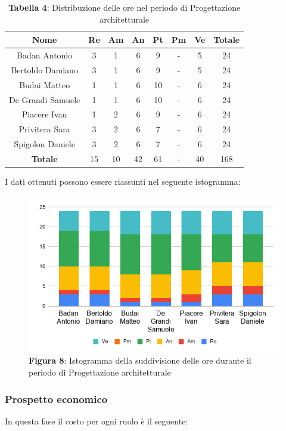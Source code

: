 \begin{table}[H]
	\centering
	\renewcommand{\arraystretch}{1.5}
	\begin{tabular}{|c|c|c|c|c|c|c|c|}
		\hline
		\rowcolor{lighter-grayer}
Nome & Re & Am & An & Pt & Pm & Ve & Totale \\ \hline
Badan Antonio & 3 & 1 & 6 & 9 & - & 5 & 24 \\ \hline
Bertoldo Damiano & 3 & 1 & 6 & 9 & - & 5 & 24 \\ \hline
Budai Matteo & 1 & 1 & 6 & 10 & - & 6 & 24 \\ \hline
De Grandi Samuele & 1 & 1 & 6 & 10 & - & 6 & 24 \\ \hline
Piacere Ivan & 1 & 2 & 6 & 9 & - & 6 & 24 \\ \hline
Privitera Sara & 3 & 2 & 6 & 7 & - & 6 & 24 \\ \hline
Spigolon Daniele & 3 & 2 & 6 & 7 & - & 6 & 24 \\ \hline
\textbf{Totale} & 15 & 10 & 42 & 61 & - & 40 & 168 \\ \hline
	\end{tabular}
	\caption*{\textbf{Tabella 4}: Distribuzione delle ore nel periodo di Progettazione architetturale\\}
\end{table}	
I dati ottenuti possono essere riassunti nel seguente istogramma:

\begin{figure}[H]
	\centering
	\includegraphics[width=0.7\linewidth]{res/images/IstogrammaFase2.png}
	\caption*{\textbf{Figura 8}: Istogramma della suddivisione delle ore durante il periodo di Progettazione architetturale}
	\label{fig:Figura10}
\end{figure}


\subsubsection{Prospetto economico}
In questa fase il costo per ogni ruolo è il seguente:

